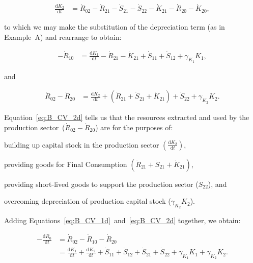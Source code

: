 \begin{align}
\label{eq:B_CV_2c}
	\frac{\mathrm{d}K_{2}}{\mathrm{d}t}	&
	=  \dot{R}_{02} 
	- \dot{R}_{21}
	- \dot{S}_{21}
	- \dot{S}_{22}
	- \dot{K}_{21}	 
	- \dot{R}_{20} 
	- \dot{K}_{20},
\end{align}

\noindent{}to which we may make the 
substitution of the depreciation term 
(as in Example~A) and rearrange 
to obtain:

\begin{align} 
\label{eq:B_CV_1d}
	- \dot{R}_{10} 	 										&
	 = \frac{\mathrm{d}K_{1}}{\mathrm{d}t}
	-  \dot{R}_{21}
	- \dot{K}_{21}
	+ \dot{S}_{11}
	+ \dot{S}_{12} 
	+ \gamma_{K_{1}}K_{1},
\end{align}

\noindent{}and

\begin{align}
\label{eq:B_CV_2d}
	\dot{R}_{02}
	- \dot{R}_{20} 											&
	= \frac{\mathrm{d}K_{2}}{\mathrm{d}t}	
	+ \left(\dot{R}_{21}
	+ \dot{S}_{21}
	+ \dot{K}_{21}\right)	 
	+ \dot{S}_{22}
	+ \gamma_{K_{2}}K_{2}.
\end{align}

Equation~\ref{eq:B_CV_2d} tells us that 
the resources extracted and used by 
the production sector~($\dot{R}_{02} - \dot{R}_{20}$)
are for the purposes of: 

\begin{itemize}
	\item{building up capital stock
	in the production sector
	$\left(\frac{\mathrm{d}K_{2}}{\mathrm{d}t}\right)$,}

	\item{providing goods 
	for Final Consumption
	$\left(\dot{R}_{21}
	+ \dot{S}_{21}
	+ \dot{K}_{21}\right)$,}

	\item{providing short-lived goods
	to support the 
	production sector ($\dot{S}_{22}$), and

	\item overcoming depreciation of production 
	capital stock ($\gamma_{K_{2}}K_{2}$).}
\end{itemize}

Adding Equations~\ref{eq:B_CV_1d}~and~\ref{eq:B_CV_2d} together,
we obtain:

\begin{align} 
	- \frac{\mathrm{d}R_{0}}{\mathrm{d}t}			&
	= \dot{R}_{02}
	- \dot{R}_{10}
	- \dot{R}_{20}									\nonumber	\\
\label{eq:B_CV_1and2}											&
	= \frac{\mathrm{d}K_{1}}{\mathrm{d}t}
	+ \frac{\mathrm{d}K_{2}}{\mathrm{d}t}
	+ \dot{S}_{11}
	+ \dot{S}_{12} 
	+ \dot{S}_{21}
	+ \dot{S}_{22}
	+ \gamma_{K_{1}}K_{1}
	+ \gamma_{K_{2}}K_{2}.
\end{align}

